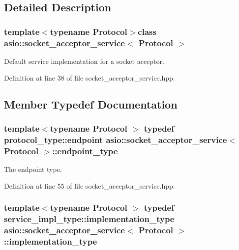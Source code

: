 \subsection{Detailed Description}
\subsubsection*{template$<$typename Protocol$>$class asio\+::socket\+\_\+acceptor\+\_\+service$<$ Protocol $>$}

Default service implementation for a socket acceptor. 

Definition at line 38 of file socket\+\_\+acceptor\+\_\+service.\+hpp.



\subsection{Member Typedef Documentation}
\hypertarget{classasio_1_1socket__acceptor__service_a2e266541d8da5db4af397b4a62bc3923}{}
\subsubsection[{endpoint\+\_\+type}]{\setlength{\rightskip}{0pt plus 5cm}template$<$typename Protocol $>$ typedef protocol\+\_\+type\+::endpoint {\bf asio\+::socket\+\_\+acceptor\+\_\+service}$<$ Protocol $>$\+::{\bf endpoint\+\_\+type}}\label{classasio_1_1socket__acceptor__service_a2e266541d8da5db4af397b4a62bc3923}


The endpoint type. 



Definition at line 55 of file socket\+\_\+acceptor\+\_\+service.\+hpp.

\hypertarget{classasio_1_1socket__acceptor__service_ae91b355a38c59424f68df71fcd9fffb8}{}
\subsubsection[{implementation\+\_\+type}]{\setlength{\rightskip}{0pt plus 5cm}template$<$typename Protocol $>$ typedef {\bf service\+\_\+impl\+\_\+type\+::implementation\+\_\+type} {\bf asio\+::socket\+\_\+acceptor\+\_\+service}$<$ Protocol $>$\+::{\bf implementation\+\_\+type}}\label{classasio_1_1socket__acceptor__service_ae91b355a38c59424f68df71fcd9fffb8}


